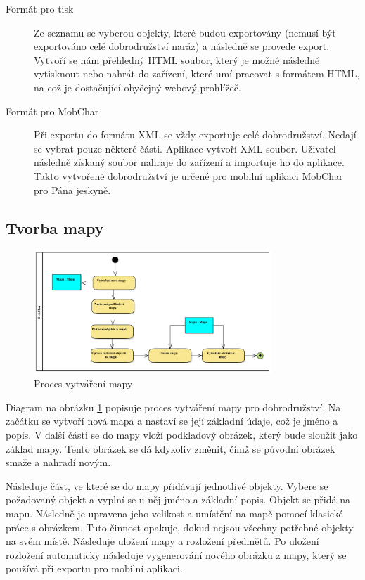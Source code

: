 \documentclass[thesis=B,czech]{resources/FITthesis}[2012/06/26]
\begin{document}
\begin{description}

\item[Formát pro tisk] Ze seznamu se vyberou objekty, které budou exportovány (nemusí být exportováno celé dobrodružství naráz) a následně se provede export. Vytvoří se nám přehledný HTML soubor, který je možné následně vytisknout nebo nahrát do zařízení, které umí pracovat s formátem HTML, na což je dostačující obyčejný webový prohlížeč.

\item[Formát pro MobChar] Při exportu do formátu XML se vždy exportuje celé dobrodružství. Nedají se vybrat pouze některé části. Aplikace vytvoří XML soubor. Uživatel následně získaný soubor nahraje do zařízení a importuje ho do aplikace. Takto vytvořené dobrodružství je určené pro mobilní aplikaci MobChar pro Pána jeskyně.

\end{description}

\subsection{Tvorba mapy}
\begin{figure}\centering
	\includegraphics[width=0.8\textwidth]{images/business_mapa}
	\caption[Proces vytváření mapy]{Proces vytváření mapy}\label{fig:bp_mapa}
\end{figure}	
Diagram na obrázku \ref{fig:bp_mapa} popisuje proces vytváření mapy pro dobrodružství. Na začátku se vytvoří nová mapa a nastaví se její základní údaje, což je jméno a popis. V další části se do mapy vloží podkladový obrázek, který bude sloužit jako základ mapy. Tento obrázek se dá kdykoliv změnit, čímž se původní obrázek smaže a nahradí novým. \par

Následuje část, ve které se do mapy přidávají jednotlivé objekty. Vybere se požadovaný objekt a vyplní se u něj jméno a základní popis. Objekt se přidá na mapu. Následně je upravena jeho velikost a umístění na mapě pomocí klasické práce s obrázkem. Tuto činnost opakuje, dokud nejsou všechny potřebné objekty na svém místě. Následuje uložení mapy a rozložení předmětů. Po uložení rozložení automaticky následuje vygenerování nového obrázku z mapy, který se používá při exportu pro mobilní aplikaci.
\end{document}
